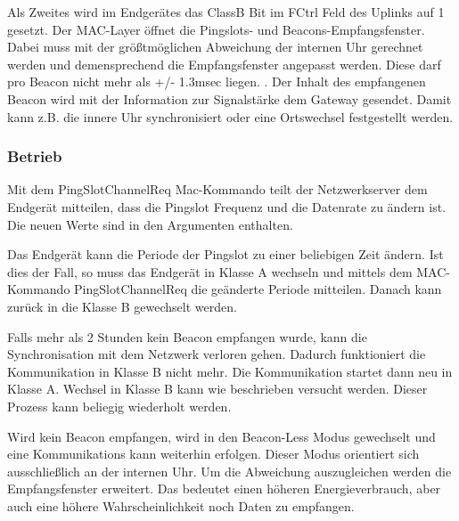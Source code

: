 \documentclass[a4paper, 12pt]{article}
\begin{document}
                Als Zweites wird im Endgerätes das ClassB Bit im FCtrl Feld des Uplinks auf 1 gesetzt. 
                Der MAC-Layer öffnet die Pingslots- und Beacons-Empfangsfenster. Dabei muss mit 
                der größtmöglichen Abweichung der internen Uhr gerechnet werden und demensprechend die 
                Empfangsfenster angepasst werden. Diese darf pro Beacon nicht mehr als +/- 1.3msec liegen. 
                \cite[S.73]{LoRaSpec}. Der Inhalt des empfangenen Beacon wird mit der Information zur 
                Signalstärke dem Gateway gesendet. Damit kann z.B. die innere Uhr synchronisiert 
                oder eine Ortswechsel festgestellt werden.
            \subsubsection{Betrieb}
                Mit dem PingSlotChannelReq Mac-Kommando teilt der Netzwerkserver dem Endgerät mitteilen, dass 
                die Pingslot Frequenz und die Datenrate zu ändern ist. Die neuen Werte sind in den 
                Argumenten enthalten.
                        
                Das Endgerät kann die Periode der Pingslot zu einer beliebigen Zeit ändern. Ist dies der Fall, so 
                muss das Endgerät in Klasse A wechseln und mittels dem MAC-Kommando PingSlotChannelReq die geänderte 
                Periode mitteilen. Danach kann zurück in die Klasse B gewechselt werden.

                Falls mehr als 2 Stunden kein Beacon empfangen wurde, kann die Synchronisation mit dem Netzwerk 
                verloren gehen. Dadurch funktioniert die Kommunikation in Klasse B nicht mehr. Die Kommunikation startet 
                dann neu in Klasse A. Wechsel in Klasse B kann wie beschrieben versucht werden. 
                Dieser Prozess kann beliegig wiederholt werden.

                Wird kein Beacon empfangen, wird in den Beacon-Less Modus gewechselt und eine Kommunikations kann 
                weiterhin erfolgen. Dieser Modus orientiert sich ausschließlich an der internen Uhr.
                Um die Abweichung auszugleichen werden die Empfangsfenster erweitert. Das bedeutet einen höheren 
                Energieverbrauch, aber auch eine höhere Wahrscheinlichkeit noch 
                Daten zu empfangen.
\end{document}

